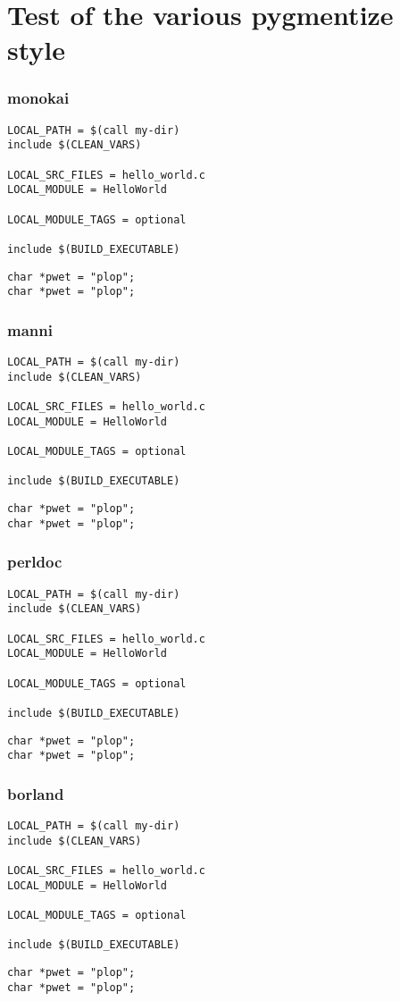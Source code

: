 \section{Test of the various pygmentize style}

\begin{frame}[fragile]
\frametitle{monokai}
\begin{verbatim}
LOCAL_PATH = $(call my-dir)
include $(CLEAN_VARS)

LOCAL_SRC_FILES = hello_world.c
LOCAL_MODULE = HelloWorld

LOCAL_MODULE_TAGS = optional

include $(BUILD_EXECUTABLE)
\end{verbatim}
\begin{verbatim}
char *pwet = "plop";
char *pwet = "plop";
\end{verbatim}
\end{frame}

\begin{frame}[fragile]
\frametitle{manni}
\begin{verbatim}
LOCAL_PATH = $(call my-dir)
include $(CLEAN_VARS)

LOCAL_SRC_FILES = hello_world.c
LOCAL_MODULE = HelloWorld

LOCAL_MODULE_TAGS = optional

include $(BUILD_EXECUTABLE)
\end{verbatim}
\begin{verbatim}
char *pwet = "plop";
char *pwet = "plop";
\end{verbatim}
\end{frame}

\begin{frame}[fragile]
\frametitle{perldoc}
\begin{verbatim}
LOCAL_PATH = $(call my-dir)
include $(CLEAN_VARS)

LOCAL_SRC_FILES = hello_world.c
LOCAL_MODULE = HelloWorld

LOCAL_MODULE_TAGS = optional

include $(BUILD_EXECUTABLE)
\end{verbatim}
\begin{verbatim}
char *pwet = "plop";
char *pwet = "plop";
\end{verbatim}
\end{frame}

\begin{frame}[fragile]
\frametitle{borland}
\begin{verbatim}
LOCAL_PATH = $(call my-dir)
include $(CLEAN_VARS)

LOCAL_SRC_FILES = hello_world.c
LOCAL_MODULE = HelloWorld

LOCAL_MODULE_TAGS = optional

include $(BUILD_EXECUTABLE)
\end{verbatim}
\begin{verbatim}
char *pwet = "plop";
char *pwet = "plop";
\end{verbatim}
\end{frame}

